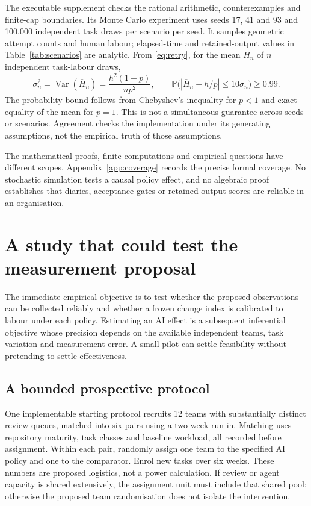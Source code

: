 \documentclass[11pt,a4paper]{amsart}
\theoremstyle{definition}
\theoremstyle{remark}
\newcommand{\Prb}{\mathbb P}
\newcommand{\Var}{\operatorname{Var}}
\begin{document}
The executable supplement checks the rational arithmetic, counterexamples and finite-cap boundaries. Its Monte Carlo experiment uses seeds 17, 41 and 93 and 100,000 independent task draws per scenario per seed. It samples geometric attempt counts and human labour; elapsed-time and retained-output values in Table~\ref{tab:scenarios} are analytic. From \eqref{eq:retry}, for the mean $\overline H_n$ of $n$ independent task-labour draws,
\begin{equation}
\label{eq:mc-bound}
 \sigma_n^2=\Var(\overline H_n)=\frac{h^2(1-p)}{np^2},\qquad
 \Prb\bigl(|\overline H_n-h/p|\leq10\sigma_n\bigr)\geq0.99.
\end{equation}
The probability bound follows from Chebyshev's inequality for $p<1$ and exact equality of the mean for $p=1$. This is not a simultaneous guarantee across seeds or scenarios. Agreement checks the implementation under its generating assumptions, not the empirical truth of those assumptions.

The mathematical proofs, finite computations and empirical questions have different scopes. Appendix~\ref{app:coverage} records the precise formal coverage. No stochastic simulation tests a causal policy effect, and no algebraic proof establishes that diaries, acceptance gates or retained-output scores are reliable in an organisation.

\section{A study that could test the measurement proposal}
\label{sec:study}

The immediate empirical objective is to test whether the proposed observations can be collected reliably and whether a frozen change index is calibrated to labour under each policy. Estimating an AI effect is a subsequent inferential objective whose precision depends on the available independent teams, task variation and measurement error. A small pilot can settle feasibility without pretending to settle effectiveness.

\subsection{A bounded prospective protocol}

One implementable starting protocol recruits 12 teams with substantially distinct review queues, matched into six pairs using a two-week run-in. Matching uses repository maturity, task classes and baseline workload, all recorded before assignment. Within each pair, randomly assign one team to the specified AI policy and one to the comparator. Enrol new tasks over six weeks. These numbers are proposed logistics, not a power calculation. If review or agent capacity is shared extensively, the assignment unit must include that shared pool; otherwise the proposed team randomisation does not isolate the intervention.
\end{document}
